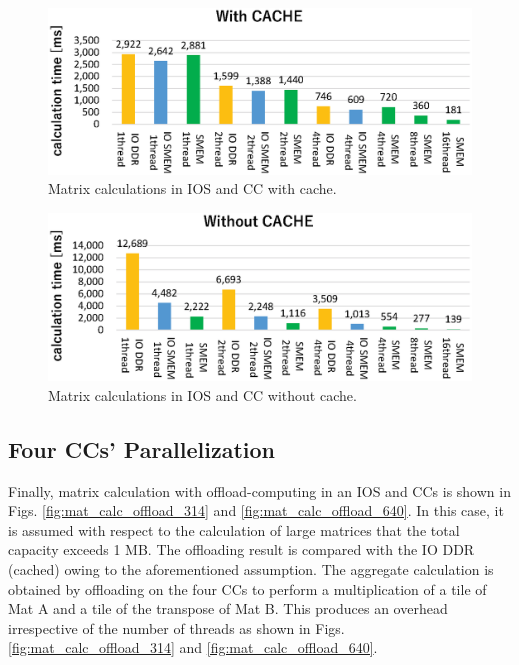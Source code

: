 \clearpage

\begin{figure}[!htbp]
  \centering
  \includegraphics[width=.9\linewidth]{../figure/BarGraph_matrix_with_cache.eps}
  \caption{Matrix calculations in IOS and CC with cache.}
  \label{fig:mat_calc_cache}
\end{figure}

\begin{figure}[!htbp]
  \centering
  \includegraphics[width=.9\linewidth]{../figure/BarGraph_matrix_without_cache.eps}
  \caption{Matrix calculations in IOS and CC without cache.}
  \label{fig:mat_calc_uncache}
\end{figure}

\subsection{Four CCs' Parallelization}
\label{sec:four_CCs}
Finally, matrix calculation with offload-computing in an IOS and CCs is shown in Figs. \ref{fig:mat_calc_offload_314} and \ref{fig:mat_calc_offload_640}.
In this case, it is assumed with respect to the calculation of large matrices that the total capacity exceeds 1 MB.
The offloading result is compared with the IO DDR (cached) owing to the aforementioned assumption.
The aggregate calculation is obtained by offloading on the four CCs to perform a multiplication of a tile of Mat A and a tile of the transpose of Mat B.
This produces an overhead irrespective of the number of threads as shown in Figs. \ref{fig:mat_calc_offload_314} and \ref{fig:mat_calc_offload_640}.

